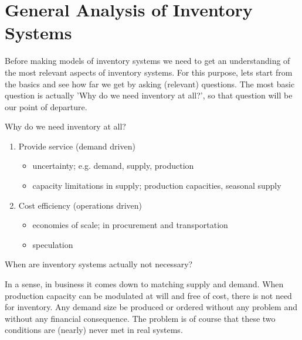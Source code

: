 \section{General Analysis of Inventory Systems}
\label{sec:general}







Before making models of inventory systems we need to get an
understanding of the most relevant aspects of inventory systems. For
this purpose, lets start from the basics and see how far we get by
asking (relevant) questions. The most basic question is actually
'Why do we need inventory at all?', so that question will be our point
of departure.

\begin{exercise}
  Why do we need inventory at all?


\begin{solution}
\begin{enumerate}
\item Provide service (demand driven)
\begin{itemize}
\item uncertainty; e.g. demand, supply, production
\item capacity limitations in supply; production capacities, seasonal supply
\end{itemize}
\item Cost efficiency (operations driven)
\begin{itemize}
\item economies of scale; in procurement and transportation
\item speculation
\end{itemize}
\end{enumerate}
\end{solution}
\end{exercise}

\begin{exercise}
  When are inventory systems actually not necessary?


\begin{solution}
  In a sense, in business it comes down to matching supply and
  demand. When production capacity can be modulated at will and free of cost,
  there is not need for inventory. Any demand size be produced or
  ordered without any problem and without any financial consequence. The problem is of course that these two conditions are (nearly)
  never met in real systems.
\end{solution}
\end{exercise}


